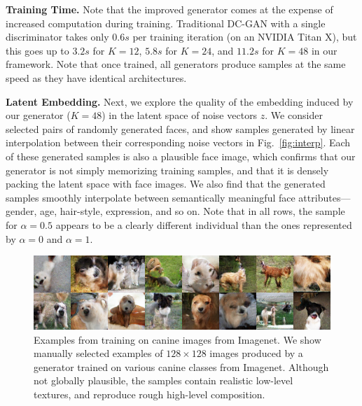 \documentclass{article}
\begin{document}
\textbf{Training Time.} Note that the improved generator comes at the expense of increased computation during training. Traditional DC-GAN with a single discriminator takes only $0.6s$ per training iteration (on an NVIDIA Titan X), but this goes up to $3.2s$ for $K=12$, $5.8s$ for $K=24$, and $11.2s$ for $K=48$ in our framework. Note that once trained, all generators produce samples at the same speed as they have identical architectures.

\textbf{Latent Embedding.} Next, we explore the quality of the embedding induced by our generator ($K=48$) in the latent space of noise vectors $z$. We consider selected pairs of randomly generated faces, and show  samples generated by linear interpolation between their corresponding noise vectors in Fig.~\ref{fig:interp}. Each of these generated samples is also a plausible face image, which confirms that our generator is not simply memorizing training samples, and that it is densely packing the latent space with face images. We also find that the generated samples smoothly interpolate between semantically meaningful face attributes---gender, age, hair-style, expression, and so on. Note that in all rows, the sample for $\alpha=0.5$ appears to be a clearly different individual than the ones represented by $\alpha=0$ and $\alpha=1$.


\begin{figure}[!t]
  \centering
    \includegraphics[width=\textwidth]{Figs/dsel.png}
\caption{Examples from training on canine images from Imagenet. We show manually selected examples of $128\times 128$ images produced by a generator trained on various canine classes from Imagenet. Although not globally plausible, the samples contain realistic low-level textures, and reproduce rough high-level composition.}
  \label{fig:highres}
\end{figure}
\end{document}
